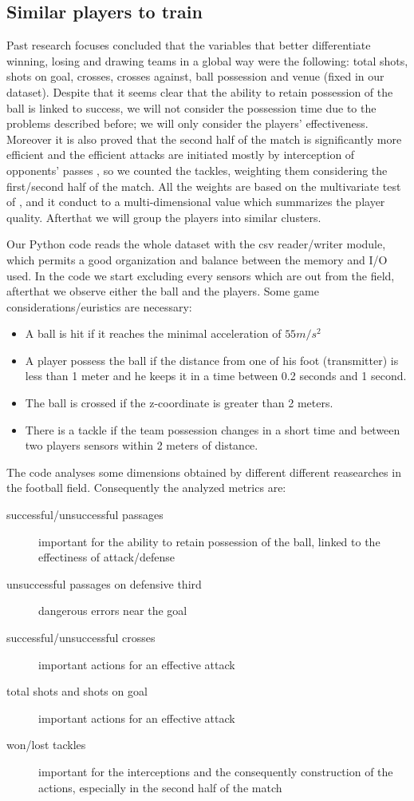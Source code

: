 \documentclass{acm_proc_article-sp-sigmod07}
\begin{document}
\subsection{Similar players to train}
Past research focuses \cite{lago2010game} concluded that the variables that better differentiate winning, losing and drawing teams in a global way were the following: total shots, shots on goal, crosses, crosses against, ball possession and venue (fixed in our dataset). Despite that it seems clear that the ability to retain possession of the ball is linked to success, we will not consider the possession time due to the problems described before; we will only consider the players' effectiveness.
Moreover it is also proved that the second half of the match is significantly more efficient and the efficient attacks are initiated mostly by interception of opponents' passes 	\cite{jankovic}, so we counted the tackles, weighting them considering the first/second half of the match.
All the weights are based on the multivariate test of \cite{lago2010game}, and it conduct to a multi-dimensional value which summarizes the player quality. Afterthat we will group the players into similar clusters. 

Our Python code reads the whole dataset with the csv reader/writer module, which permits a good organization and balance between the memory and I/O used. In the code we start excluding every sensors which are out from the field, afterthat we observe either the ball and the players. Some game considerations/euristics are necessary:
\begin{itemize}
  \item A ball is hit if it reaches the minimal acceleration of $55 m/s^2$
  \item A player possess the ball if the distance from one of his foot (transmitter) is less than 1 meter and he keeps it in a time between 0.2 seconds and 1 second.
  \item The ball is crossed if the z-coordinate is greater than 2 meters.
  \item There is a tackle if the team possession changes in a short time and between two players sensors within 2 meters of distance.
\end{itemize}
The code analyses some dimensions obtained by different different reasearches in the football field. Consequently the analyzed metrics are:
\begin{description}
  \item[successful/unsuccessful passages] important for the ability to retain possession of the ball, linked to the effectiness of attack/defense
  \item[unsuccessful passages on defensive third] dangerous errors near the goal
  \item[successful/unsuccessful crosses] important actions for an effective attack \cite{lago2010game}
\item[total shots and shots on goal] important actions for an effective attack \cite{lago2010game}
\item[won/lost tackles] important for the interceptions and the consequently construction of the actions, especially in the second half of the match \cite{jankovic}
\end{description}
\end{document}
